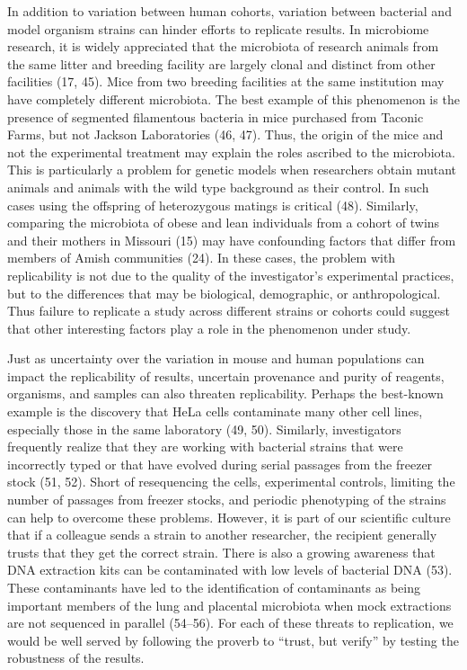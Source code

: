 \documentclass[]{article}
\begin{document}
In addition to variation between human cohorts, variation between
bacterial and model organism strains can hinder efforts to replicate
results. In microbiome research, it is widely appreciated that the
microbiota of research animals from the same litter and breeding
facility are largely clonal and distinct from other facilities (17, 45).
Mice from two breeding facilities at the same institution may have
completely different microbiota. The best example of this phenomenon is
the presence of segmented filamentous bacteria in mice purchased from
Taconic Farms, but not Jackson Laboratories (46, 47). Thus, the origin
of the mice and not the experimental treatment may explain the roles
ascribed to the microbiota. This is particularly a problem for genetic
models when researchers obtain mutant animals and animals with the wild
type background as their control. In such cases using the offspring of
heterozygous matings is critical (48). Similarly, comparing the
microbiota of obese and lean individuals from a cohort of twins and
their mothers in Missouri (15) may have confounding factors that differ
from members of Amish communities (24). In these cases, the problem with
replicability is not due to the quality of the investigator's
experimental practices, but to the differences that may be biological,
demographic, or anthropological. Thus failure to replicate a study
across different strains or cohorts could suggest that other interesting
factors play a role in the phenomenon under study.

Just as uncertainty over the variation in mouse and human populations
can impact the replicability of results, uncertain provenance and purity
of reagents, organisms, and samples can also threaten replicability.
Perhaps the best-known example is the discovery that HeLa cells
contaminate many other cell lines, especially those in the same
laboratory (49, 50). Similarly, investigators frequently realize that
they are working with bacterial strains that were incorrectly typed or
that have evolved during serial passages from the freezer stock (51,
52). Short of resequencing the cells, experimental controls, limiting
the number of passages from freezer stocks, and periodic phenotyping of
the strains can help to overcome these problems. However, it is part of
our scientific culture that if a colleague sends a strain to another
researcher, the recipient generally trusts that they get the correct
strain. There is also a growing awareness that DNA extraction kits can
be contaminated with low levels of bacterial DNA (53). These
contaminants have led to the identification of contaminants as being
important members of the lung and placental microbiota when mock
extractions are not sequenced in parallel (54--56). For each of these
threats to replication, we would be well served by following the proverb
to ``trust, but verify'' by testing the robustness of the results.
\end{document}
